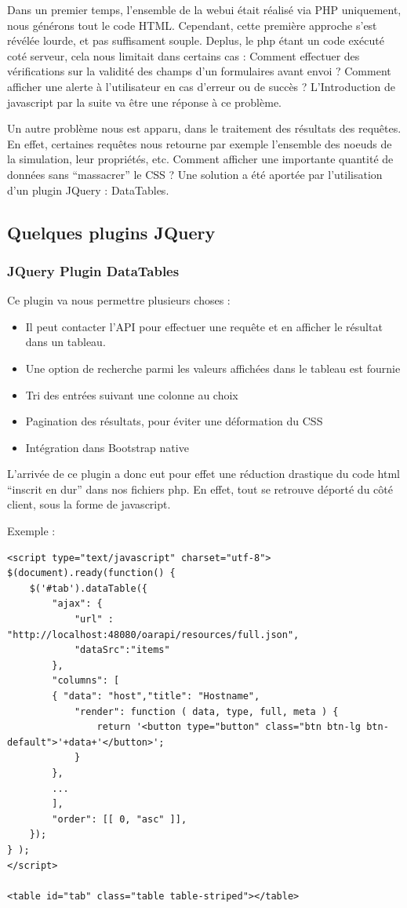 \documentclass[a4paper,10pt]{article}
\begin{document}
Dans un premier temps, l'ensemble de la webui était réalisé via PHP uniquement, nous générons tout le code HTML. Cependant, cette première approche s'est révélée lourde, et pas suffisament souple.
Deplus, le php étant un code exécuté coté serveur, cela nous limitait dans certains cas : Comment effectuer des vérifications sur la validité des champs d'un formulaires avant envoi ? Comment afficher une alerte à l'utilisateur
en cas d'erreur ou de succès ? L'Introduction de javascript par la suite va être une réponse à ce problème.
\vspace{0.5cm}

Un autre problème nous est apparu, dans le traitement des résultats des requêtes. En effet, certaines requêtes nous retourne par exemple l'ensemble des noeuds de la simulation, leur propriétés, etc. Comment afficher une importante
quantité de données sans ``massacrer'' le CSS ? Une solution a été aportée par l'utilisation d'un plugin JQuery : DataTables.
\newpage
\subsection{Quelques plugins JQuery}
\subsubsection{JQuery Plugin DataTables}
Ce plugin va nous permettre plusieurs choses :
\begin{itemize}
 \item Il peut contacter l'API pour effectuer une requête et en afficher le résultat dans un tableau.
 \item Une option de recherche parmi les valeurs affichées dans le tableau est fournie
 \item Tri des entrées suivant une colonne au choix
 \item Pagination des résultats, pour éviter une déformation du CSS
 \item Intégration dans Bootstrap native
\end{itemize}

L'arrivée de ce plugin a donc eut pour effet une réduction drastique du code html ``inscrit en dur'' dans nos fichiers php.
En effet, tout se retrouve déporté du côté client, sous la forme de javascript.

Exemple :
\begin{lstlisting}
<script type="text/javascript" charset="utf-8">
$(document).ready(function() {
	$('#tab').dataTable({
		"ajax": {
			"url" : "http://localhost:48080/oarapi/resources/full.json",
			"dataSrc":"items"
		},
		"columns": [
		{ "data": "host","title": "Hostname",
			"render": function ( data, type, full, meta ) {
				return '<button type="button" class="btn btn-lg btn-default">'+data+'</button>';
		    }
		},
		...
		],
		"order": [[ 0, "asc" ]],
	});
} );
</script>

<table id="tab" class="table table-striped"></table>
\end{lstlisting}
\end{document}
